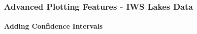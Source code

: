 \documentclass[10pt]{beamer}
\begin{document}
\begin{frame}
\frametitle{Advanced Plotting Features - IWS Lakes Data}
\framesubtitle{Adding Confidence Intervals}
\begin{center}
\end{center}

\end{frame}
\end{document}
